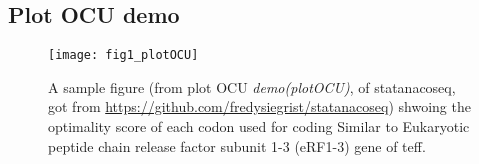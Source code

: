 \subsection{Plot OCU demo}
\begin{figure}[tb] 
\centering 
\texttt{[image: fig1\_plotOCU]} 
\caption[A sample figure from demo plotOCU]{A sample figure (from plot OCU \emph{demo(plotOCU)}, of statanacoseq, got from \url{https://github.com/fredysiegrist/statanacoseq}) shwoing the optimality score of each codon used for coding Similar to Eukaryotic peptide chain release factor subunit 1-3 (eRF1-3) gene of teff.}
\label{fig:plotOCU} 
\end{figure}
